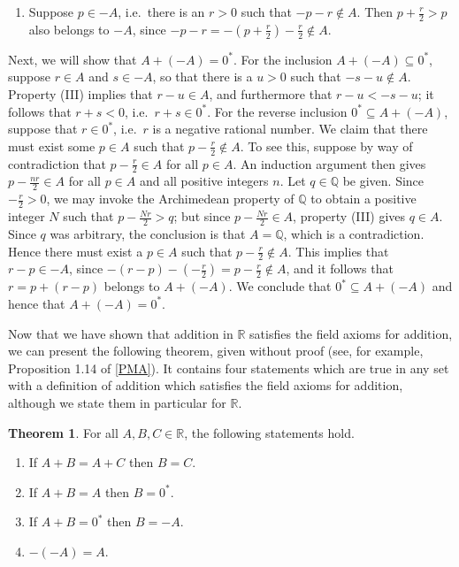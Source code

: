 \documentclass[12pt]{article}
\theoremstyle{definition}
\newtheorem{theorem}{Theorem}
\begin{document}
\begin{enumerate}[label = (A\arabic*)]
\begin{enumerate}[label = (\Roman*)]
        \item Suppose \( p \in -A \), i.e.\ there is an \( r > 0 \) such that \( -p - r \not\in A \). Then \( p + \frac{r}{2} > p \) also belongs to \( -A \), since \( -p - r = -\left(p + \frac{r}{2}\right) - \frac{r}{2} \not\in A \).
    \end{enumerate}
    
    Next, we will show that \( A + (-A) = 0^* \). For the inclusion \( A + (-A) \subseteq 0^* \), suppose \( r \in A \) and \( s \in -A \), so that there is a \( u > 0 \) such that \( -s - u \not\in A \). Property (III) implies that \( r - u \in A \), and furthermore that \( r - u < -s - u \); it follows that \( r + s < 0 \), i.e.\ \( r + s \in 0^* \). For the reverse inclusion \( 0^* \subseteq A + (-A) \), suppose that \( r \in 0^* \), i.e.\ \( r \) is a negative rational number. We claim that there must exist some \( p \in A \) such that \( p - \frac{r}{2} \not\in A \). To see this, suppose by way of contradiction that \( p - \frac{r}{2} \in A \) for all \( p \in A \). An induction argument then gives \( p - \frac{nr}{2} \in A \) for all \( p \in A \) and all positive integers \( n \). Let \( q \in \mathbb{Q} \) be given. Since \( -\frac{r}{2} > 0 \), we may invoke the Archimedean property of \( \mathbb{Q} \) to obtain a positive integer \( N \) such that \( p -\frac{Nr}{2} > q \); but since \( p -\frac{Nr}{2} \in A \), property (III) gives \( q \in A \). Since \( q \) was arbitrary, the conclusion is that \( A = \mathbb{Q} \), which is a contradiction. Hence there must exist a \( p \in A \) such that \( p - \frac{r}{2} \not\in A \). This implies that \( r - p \in -A \), since \( -(r - p) - (-\frac{r}{2}) = p - \frac{r}{2} \not\in A \), and it follows that \( r = p + (r - p) \) belongs to \( A + (-A) \). We conclude that \( 0^* \subseteq A + (-A) \) and hence that \( A + (-A) = 0^* \).
\end{enumerate}

Now that we have shown that addition in \( \mathbb{R} \) satisfies the field axioms for addition, we can present the following theorem, given without proof (see, for example, Proposition 1.14 of \hyperlink{pma}{[PMA]}). It contains four statements which are true in any set with a definition of addition which satisfies the field axioms for addition, although we state them in particular for \( \mathbb{R} \).

\begin{theorem}
\label{thm:addition_axioms}
    For all \( A, B, C \in \mathbb{R} \), the following statements hold.
    \begin{enumerate}[label = (\alph*)]
        \item If \( A + B = A + C \) then \( B = C \).

        \item If \( A + B = A \) then \( B = 0^* \).

        \item If \( A + B = 0^* \) then \( B = -A \).

        \item \( -(-A) = A \).
    \end{enumerate}
\end{theorem}
\end{document}
